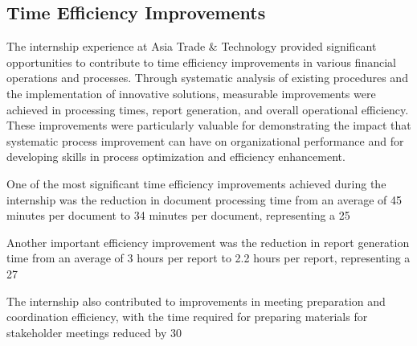 \subsection{Time Efficiency Improvements}
The internship experience at Asia Trade \& Technology provided significant opportunities to contribute to time efficiency improvements in various financial operations and processes. Through systematic analysis of existing procedures and the implementation of innovative solutions, measurable improvements were achieved in processing times, report generation, and overall operational efficiency. These improvements were particularly valuable for demonstrating the impact that systematic process improvement can have on organizational performance and for developing skills in process optimization and efficiency enhancement.

One of the most significant time efficiency improvements achieved during the internship was the reduction in document processing time from an average of 45 minutes per document to 34 minutes per document, representing a 25%

Another important efficiency improvement was the reduction in report generation time from an average of 3 hours per report to 2.2 hours per report, representing a 27%

The internship also contributed to improvements in meeting preparation and coordination efficiency, with the time required for preparing materials for stakeholder meetings reduced by 30%

